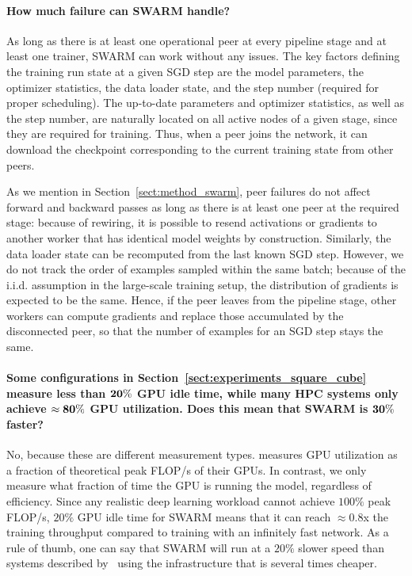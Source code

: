 \paragraph{How much failure can SWARM handle?}
As long as there is at least one operational peer at every pipeline stage and at least one trainer, SWARM can work without any issues. 
The key factors defining the training run state at a given SGD step are the model parameters, the optimizer statistics, the data loader state, and the step number (required for proper scheduling). The up-to-date parameters and optimizer statistics, as well as the step number, are naturally located on all active nodes of a given stage, since they are required for training. Thus, when a peer joins the network, it can download the checkpoint corresponding to the current training state from other peers.

As we mention in Section~\ref{sect:method_swarm}, peer failures do not affect forward and backward passes as long as there is at least one peer at the required stage: because of rewiring, it is possible to resend activations or gradients to another worker that has identical model weights by construction. Similarly, the data loader state can be recomputed from the last known SGD step. However, we do not track the order of examples sampled within the same batch; because of the i.i.d. assumption in the large-scale training setup, the distribution of gradients is expected to be the same. Hence, if the peer leaves from the pipeline stage, other workers can compute gradients and replace those accumulated by the disconnected peer, so that the number of examples for an SGD step stays the same.

\paragraph{Some configurations in Section~\ref{sect:experiments_square_cube} measure less than $\bf 20\%$ GPU idle time, while many HPC systems only achieve $\bf \approx80\%$ GPU utilization. Does this mean that SWARM is $\bf 30\%$ faster?} 
No, because these are different measurement types. \citet{megatron2} measures GPU utilization as a fraction of theoretical peak FLOP/s of their GPUs. In contrast, we only measure what fraction of time the GPU is running the model, regardless of efficiency. Since any realistic deep learning workload cannot achieve $100\%$ peak FLOP/s, $20\%$ GPU idle time for SWARM means that it can reach $\approx0.8$x the training throughput compared to training with an infinitely fast network. As a rule of thumb, one can say that SWARM will run at a $20\%$ slower speed than systems described by~\citet{megatron2} using the infrastructure that is several times cheaper.%



